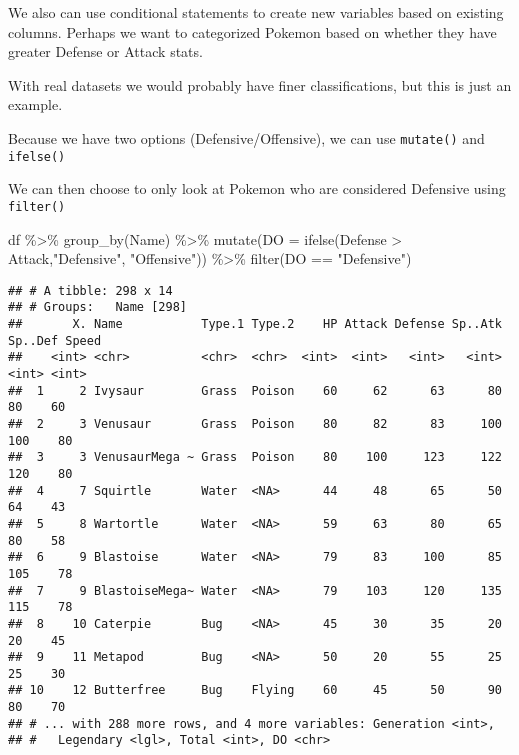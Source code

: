 \documentclass[
]{article}
\newenvironment{Shaded}{\begin{snugshade}}{\end{snugshade}}
\newcommand{\AttributeTok}[1]{\textcolor[rgb]{0.77,0.63,0.00}{#1}}
\newcommand{\FunctionTok}[1]{\textcolor[rgb]{0.00,0.00,0.00}{#1}}
\newcommand{\NormalTok}[1]{#1}
\newcommand{\SpecialCharTok}[1]{\textcolor[rgb]{0.00,0.00,0.00}{#1}}
\newcommand{\StringTok}[1]{\textcolor[rgb]{0.31,0.60,0.02}{#1}}
\begin{document}
We also can use conditional statements to create new variables based on
existing columns. Perhaps we want to categorized Pokemon based on
whether they have greater Defense or Attack stats.

With real datasets we would probably have finer classifications, but
this is just an example.

Because we have two options (Defensive/Offensive), we can use
\texttt{mutate()} and \texttt{ifelse()}

We can then choose to only look at Pokemon who are considered Defensive
using \texttt{filter()}

\begin{Shaded}
\begin{Highlighting}[]
\NormalTok{df }\SpecialCharTok{\%\textgreater{}\%} 
      \FunctionTok{group\_by}\NormalTok{(Name) }\SpecialCharTok{\%\textgreater{}\%}
      \FunctionTok{mutate}\NormalTok{(}\AttributeTok{DO =} \FunctionTok{ifelse}\NormalTok{(Defense }\SpecialCharTok{\textgreater{}}\NormalTok{ Attack,}\StringTok{"Defensive"}\NormalTok{, }\StringTok{"Offensive"}\NormalTok{)) }\SpecialCharTok{\%\textgreater{}\%}
      \FunctionTok{filter}\NormalTok{(DO }\SpecialCharTok{==} \StringTok{"Defensive"}\NormalTok{)}
\end{Highlighting}
\end{Shaded}

\begin{verbatim}
## # A tibble: 298 x 14
## # Groups:   Name [298]
##       X. Name           Type.1 Type.2    HP Attack Defense Sp..Atk Sp..Def Speed
##    <int> <chr>          <chr>  <chr>  <int>  <int>   <int>   <int>   <int> <int>
##  1     2 Ivysaur        Grass  Poison    60     62      63      80      80    60
##  2     3 Venusaur       Grass  Poison    80     82      83     100     100    80
##  3     3 VenusaurMega ~ Grass  Poison    80    100     123     122     120    80
##  4     7 Squirtle       Water  <NA>      44     48      65      50      64    43
##  5     8 Wartortle      Water  <NA>      59     63      80      65      80    58
##  6     9 Blastoise      Water  <NA>      79     83     100      85     105    78
##  7     9 BlastoiseMega~ Water  <NA>      79    103     120     135     115    78
##  8    10 Caterpie       Bug    <NA>      45     30      35      20      20    45
##  9    11 Metapod        Bug    <NA>      50     20      55      25      25    30
## 10    12 Butterfree     Bug    Flying    60     45      50      90      80    70
## # ... with 288 more rows, and 4 more variables: Generation <int>,
## #   Legendary <lgl>, Total <int>, DO <chr>
\end{verbatim}
\end{document}

